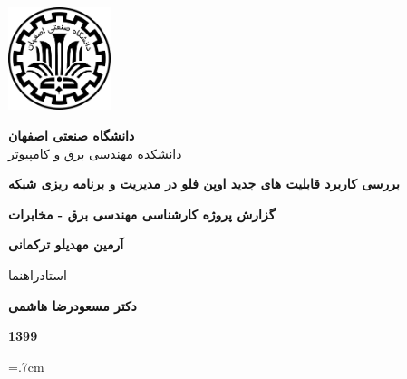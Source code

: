 \thispagestyle{empty}
\begin{center}
\includegraphics[height=3cm]{imgs/iut_logo.png}
\vspace{0.5cm}

{\large
	\textbf{دانشگاه صنعتی اصفهان}\\
	دانشکده مهندسی برق و کامپیوتر
}
\vspace{3.5cm}

{\LARGE
	\textbf{بررسی کاربرد قابلیت های جدید اوپن فلو در مدیریت و برنامه ریزی شبکه}\\
}
\vspace{3.5cm}

{\large
	\textbf{گزارش پروژه کارشناسی مهندسی برق - مخابرات}\\
}
\vspace{1cm}

{\Large
	\textbf{آرمین مهدیلو ترکمانی}\\
}
\vspace{2.5cm}

{\large
	استادراهنما\\
}
\vspace{0.5cm}

{\Large
	\textbf{دکتر مسعودرضا هاشمی}\\
}
\vspace{3.5cm}

{\Large
	\textbf{1399}
}

\end{center}
\restoregeometry
\pagebreak




\baselineskip=.7cm

\tableofcontents
\pagebreak


\titlespacing*{\chapter}{0pt}{3.5cm}{6cm}
